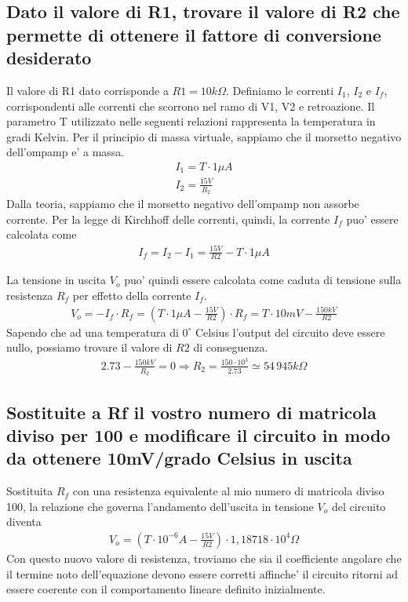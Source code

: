 \documentclass[a4paper,10pt]{article}
\begin{document}
\subsection{Dato il valore di R1, trovare il valore di R2 che permette di ottenere il fattore di conversione desiderato}
Il valore di R1 dato corrisponde a $R1=10k\Omega$. Definiamo le correnti $I_1$, $I_2$ e $I_f$, corrispondenti alle correnti che scorrono nel ramo di V1, V2 e retroazione. Il parametro T utilizzato nelle seguenti relazioni rappresenta la temperatura in gradi Kelvin. Per il principio di massa virtuale, sappiamo che il morsetto negativo dell'ompamp e' a massa. 
\begin{gather*}
I_1 = T \cdot 1\mu A \\
I_2 = \frac{15V}{R_2} 
\end{gather*}
Dalla teoria, sappiamo che il morsetto negativo dell'ompamp non assorbe corrente. Per la legge di Kirchhoff delle correnti, quindi, la corrente $I_f$ puo' essere calcolata come
\begin{align*}
I_f = I_2 - I_1 = \frac{15V}{R2} - T\cdot 1\mu A
\end{align*}

La tensione in uscita $V_o$ puo' quindi essere calcolata come caduta di tensione sulla resistenza $R_f$ per effetto della corrente $I_f$. 
\begin{align*}
V_o = -I_f \cdot R_f = (T\cdot 1\mu A - \frac{15V}{R2}) \cdot R_f = T\cdot 10mV - \frac{150kV}{R2}
\end{align*}
Sapendo che ad una temperatura di $0^{\circ}$ Celsius l'output del circuito deve essere nullo, possiamo trovare il valore di $R2$ di conseguenza.
\begin{align*}
2.73 - \frac{150kV}{R_2} = 0 \Rightarrow R_2 = \frac{150\cdot 10^3}{2.73} \simeq 54\,945k\Omega
\end{align*}

\pagebreak

\subsection{Sostituite a Rf il vostro numero di matricola diviso per 100 e modificare il circuito in modo da ottenere 10mV/grado Celsius in uscita}
Sostituita $R_f$ con una resistenza equivalente al mio numero di matricola diviso 100, la relazione che governa l'andamento dell'uscita in tensione $V_o$ del circuito diventa
\begin{align*}
V_o = (T\cdot 10^{-6}A - \frac{15V}{R2})\cdot 1,18718\cdot 10^4 \Omega
\end{align*}
Con questo nuovo valore di resistenza, troviamo che sia il coefficiente angolare che il termine noto dell'equazione devono essere corretti affinche' il circuito ritorni ad essere coerente con il comportamento lineare definito inizialmente.  \par
\end{document}
